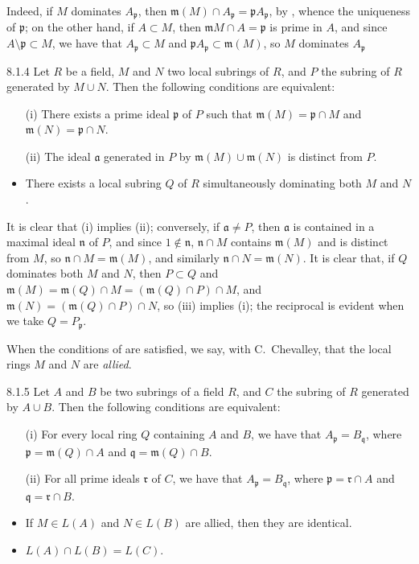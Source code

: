 \documentclass[10pt,oneside]{book}
\begin{document}
Indeed, if $M$ dominates $A_\mathfrak{p}$, then $\mathfrak{m}(M)\cap
A_\mathfrak{p}=\mathfrak{p}A_\mathfrak{p}$, by , whence the
uniqueness of $\mathfrak{p}$; on the other hand, if $A\subset M$, then
$\mathfrak{m}M\cap A=\mathfrak{p}$ is prime in $A$, and since
$A\setminus\mathfrak{p}\subset M$, we have that $A_\mathfrak{p}\subset M$ and
$\mathfrak{p}A_\mathfrak{p}\subset\mathfrak{m}(M)$, so $M$ dominates
$A_\mathfrak{p}$

\begin{envs}[Lemma]{8.1.4}
\label{lem-1.8.1.4}
Let $R$ be a field, $M$ and $N$ two local
subrings of $R$, and $P$ the subring of $R$ generated by $M\cup N$. Then the
following conditions are equivalent:
\begin{itemize}
  \item[(i)] There exists a prime ideal $\mathfrak{p}$ of $P$ such that
$\mathfrak{m}(M)=\mathfrak{p}\cap M$ and $\mathfrak{m}(N)=\mathfrak{p}\cap N$.
  \item[(ii)] The ideal $\mathfrak{a}$ generated in $P$ by
$\mathfrak{m}(M)\cup\mathfrak{m}(N)$ is distinct from $P$. \item There exists a
local subring $Q$ of $R$ simultaneously dominating both $M$ and $N$.
\end{itemize}
\end{envs}

It is clear that (i) implies (ii); conversely, if $\mathfrak{a}\neq P$, then
$\mathfrak{a}$ is contained in a maximal ideal $\mathfrak{n}$ of $P$, and since
$1\not\in\mathfrak{n}$, $\mathfrak{n}\cap M$ contains $\mathfrak{m}(M)$ and is
distinct from $M$, so $\mathfrak{n}\cap M=\mathfrak{m}(M)$, and similarly
$\mathfrak{n}\cap N=\mathfrak{m}(N)$. It is clear that, if $Q$ dominates both
$M$ and $N$, then $P\subset Q$ and $\mathfrak{m}(M)=\mathfrak{m}(Q)\cap
M=(\mathfrak{m}(Q)\cap P)\cap M$, and $\mathfrak{m}(N)=(\mathfrak{m}(Q)\cap
P)\cap N$, so (iii) implies (i); the reciprocal is evident when we take
$Q=P_\mathfrak{p}$.

When the conditions of  are satisfied, we say, with C.~Chevalley,
that the local rings $M$ and $N$ are \emph{allied}.

\begin{envs}[Proposition]{8.1.5}
\label{prop-1.8.1.5}
Let $A$ and $B$ be two subrings of a field $R$,
and $C$ the subring of $R$ generated by $A\cup B$. Then the following
conditions are equivalent:
\begin{itemize}
  \item[(i)] For every local ring $Q$ containing $A$ and $B$, we have that
  $A_\mathfrak{p}=B_\mathfrak{q}$, where $\mathfrak{p}=\mathfrak{m}(Q)\cap A$ and
$\mathfrak{q}=\mathfrak{m}(Q)\cap B$.
  \item[(ii)] For all prime ideals $\mathfrak{r}$
of $C$, we have that $A_\mathfrak{p}=B_\mathfrak{q}$, where
$\mathfrak{p}=\mathfrak{r}\cap A$ and $\mathfrak{q}=\mathfrak{r}\cap B$. \item
If $M\in L(A)$ and $N\in L(B)$ are allied, then they are identical. \item
$L(A)\cap L(B)=L(C)$.
\end{itemize}
\end{envs}
\end{document}
